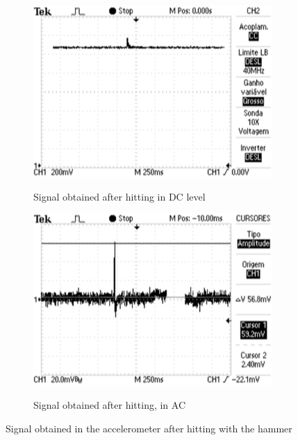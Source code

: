 \begin{figure}[]
    \centering
    \begin{subfigure}{0.45\textwidth}
        \centering
        \includegraphics[width=\linewidth]{Chapters/4CHP/Figures/maxAccNDC.eps}
        \caption{Signal obtained after hitting in DC level}{}
        \label{subfig:maxAccNDC}
    \end{subfigure}
    \begin{subfigure}{0.45\textwidth}
        \centering
        \includegraphics[width=\linewidth]{Chapters/4CHP/Figures/maxAccN.eps}
        \caption{Signal obtained after hitting, in AC}{}
        \label{subfig:maxAccN}
    \end{subfigure}
    \caption{Signal obtained in the accelerometer after hitting with the hammer}
    \label{fig:NampSigAcc}
\end{figure}
